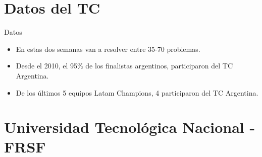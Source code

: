 \documentclass{beamer}
\begin{document}
\section{Datos del TC}
\begin{frame}{Datos}
    \begin{itemize}
        \item En estas dos semanas van a resolver entre 35-70 problemas.
        \item Desde el 2010, el 95\% de los finalistas argentinos, participaron del TC Argentina.
        \item De los últimos 5 equipos Latam Champions, 4 participaron del TC Argentina.
    \end{itemize}
\end{frame}

\section{Universidad Tecnológica Nacional - FRSF}
\end{document}
